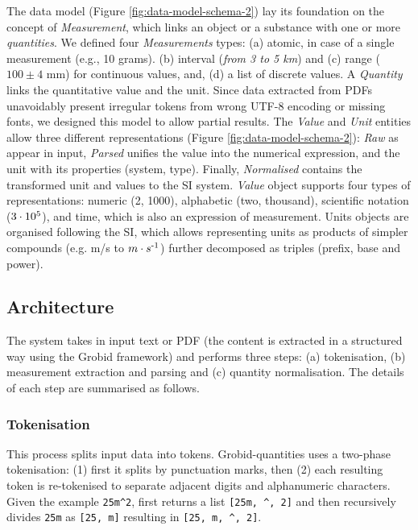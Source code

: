 The data model (Figure \ref{fig:data-model-schema-2}) lay its foundation on the concept of \textit{Measurement}, which links an object or a substance with one or more \textit{quantities}. We defined four \textit{Measurements} types: (a) atomic, in case of a single measurement (e.g., 10 grams). (b) interval (\textit{from 3 to 5 km}) and (c) range ($100 \pm 4$ mm) for continuous values, and, (d) a list of discrete values. A \textit{Quantity} links the quantitative value and the unit. 
Since data extracted from PDFs unavoidably present irregular tokens from wrong UTF-8 encoding or missing fonts, we designed this model to allow partial results. The \textit{Value} and \textit{Unit} entities allow three different representations (Figure \ref{fig:data-model-schema-2}): \textit{Raw} as appear in input, \textit{Parsed} unifies the value into the numerical expression, and the unit with its properties (system, type). Finally, \textit{Normalised} contains the transformed unit and values to the SI system. \textit{Value} object supports four types of representations: numeric (2, 1000), alphabetic (two, thousand), scientific notation ($3\cdot10\textsuperscript{5}$), and time, which is also an expression of measurement. Units objects are organised following the SI, which allows representing units as products of simpler compounds (e.g. m/s to $m \cdot s\textsuperscript{-1}$) further decomposed as triples (prefix, base and power).

\subsection{Architecture}
The system takes in input text or PDF (the content is extracted in a structured way using the Grobid framework) and performs three steps: (a) tokenisation, (b) measurement extraction and parsing and (c) quantity normalisation. The details of each step are summarised as follows. 

\subsubsection{Tokenisation}
This process splits input data into tokens. Grobid-quantities uses a two-phase tokenisation: (1) first it splits by punctuation marks, then (2) each resulting token is re-tokenised to separate adjacent digits and alphanumeric characters. Given the example \texttt{25m\^{}2}, first returns a list \texttt{[25m, \^{}, 2]} and then recursively divides \texttt{25m} as \texttt{[25, m]}  resulting in \texttt{[25, m, \^{}, 2]}.

